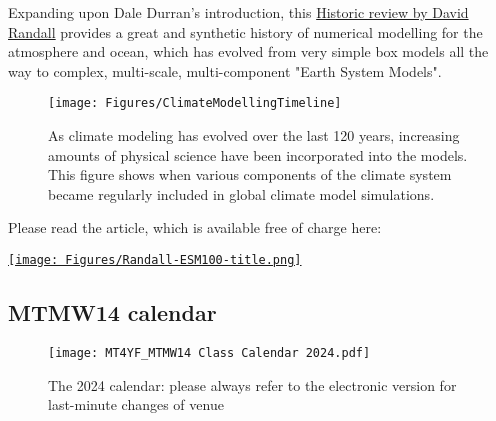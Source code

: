 \documentclass[11pt,fleqn]{book} %
\begin{document}
	Expanding upon Dale Durran's introduction, this \href{https://journals.ametsoc.org/view/journals/amsm/59/1/amsmonographs-d-18-0018.1.xml}{Historic review by David Randall} provides a great and synthetic history of numerical modelling for the atmosphere and ocean, which has evolved from very simple box models all the way to complex, multi-scale, multi-component "Earth System Models". \\
	
		\begin{figure}[h!]
		\texttt{[image: Figures/ClimateModellingTimeline]}
		\caption{As climate modeling has evolved over the last 120 years, increasing amounts of physical science have been incorporated into the models. This figure shows when various components of the climate system became regularly included in global climate model simulations.}
	\end{figure}

	Please read the article, which is available free of charge here:  

\href{https://journals.ametsoc.org/view/journals/amsm/59/1/amsmonographs-d-18-0018.1.xml} {\texttt{[image: Figures/Randall-ESM100-title.png]}}

\clearpage
\subsection{MTMW14 calendar}

\begin{figure}[h!]
	\texttt{[image: MT4YF\_MTMW14 Class Calendar 2024.pdf]}
	\caption{The 2024 calendar: please always refer to the electronic version for last-minute changes of venue}
\end{figure}

\newpage	


\newpage	


\newpage	


\newpage	

\end{document}

